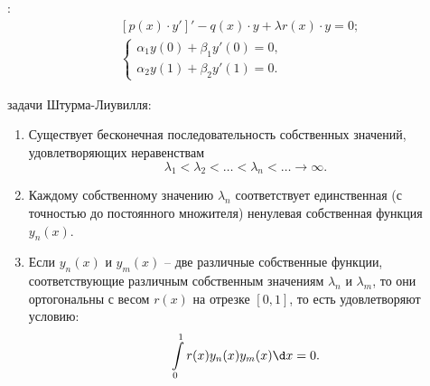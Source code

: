 \begin{multicols}{2}
:
\begin{align*}
    & [p(x)\cdot y']' - q(x)\cdot y + \lambda r(x)\cdot y = 0; \\
    & \left\{ \begin{array}{l}
        \alpha_1 y(0) + \beta_1 y'(0) = 0, \\
        \alpha_2 y(1) + \beta_2 y'(1) = 0.
    \end{array} \right.
\end{align*}

 задачи Штурма-Лиувилля:
\begin{enumerate}
    \item Существует бесконечная последовательность собственных значений,
    удовлетворяющих неравенствам
    \[
        \lambda_1 < \lambda_2 < \ldots < \lambda_n < \ldots \to \infty.
    \]
    \item Каждому собственному значению \( \lambda_n \) соответствует
    единственная (с точностью до постоянного множителя) ненулевая собственная
    функция \( y_n(x) \). 
    \item Если \( y_n(x) \) и \( y_m(x) \) -- две различные собственные функции,
    соответствующие различным собственным значениям \( \lambda_n \) и
    \( \lambda_m \), то они ортогональны с весом \( r(x) \) на отрезке
    \( [0, 1] \), то есть удовлетворяют условию:
    \[
        \int\limits_0^1 r(x)y_n(x)y_m(x)\d x = 0.
    \]
\end{enumerate}
\end{multicols}

\newpage
